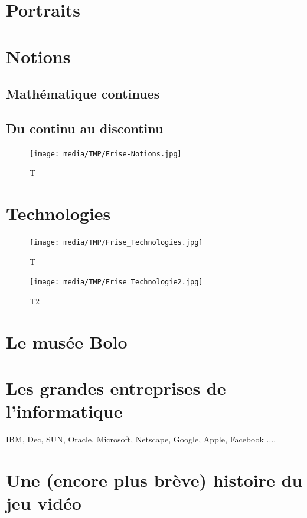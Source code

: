 \documentclass[a4paper,11pt]{book}
\begin{document}
\begin{appendix}
\chapter{Portraits}

\chapter{Notions}

\section{Mathématique continues}

\section{Du continu au discontinu}



\begin{figure}[h]
    \centering
    \texttt{[image: media/TMP/Frise-Notions.jpg]}
    \caption{T}
\end{figure}

\chapter{Technologies}

\begin{figure}[h]
    \centering
    \texttt{[image: media/TMP/Frise\_Technologies.jpg]}
    \caption{T}
\end{figure}

\begin{figure}[h]
    \centering
    \texttt{[image: media/TMP/Frise\_Technologie2.jpg]}
    \caption{T2}
\end{figure}

\chapter{Le musée Bolo}

\chapter{Les grandes entreprises de l'informatique}

IBM, Dec, SUN, Oracle, Microsoft, Netscape, Google, Apple, Facebook ....

\chapter{Une (encore plus brève) histoire du jeu vidéo}

\end{appendix}
\end{document}
